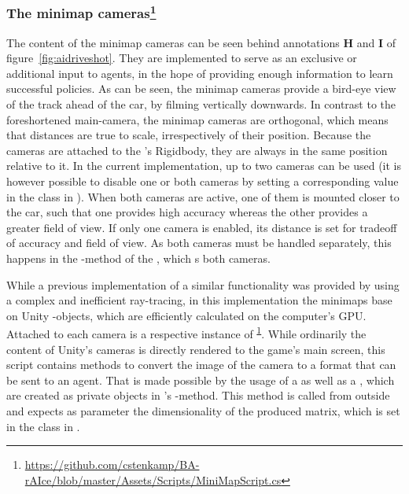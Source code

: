 \subsubsection{The minimap cameras\footnote{\label{fn:minimap}\url{https://github.com/cstenkamp/BA-rAIce/blob/master/Assets/Scripts/MiniMapScript.cs}}}
\label{ch:minimap}

The content of the minimap cameras can be seen behind annotations \textbf{H} and \textbf{I} of figure~\ref{fig:aidriveshot}. They are implemented to serve as an exclusive or additional input to agents, in the hope of providing enough information to learn successful policies. As can be seen, the minimap cameras provide a bird-eye view of the track ahead of the car, by filming vertically downwards. In contrast to the foreshortened main-camera, the minimap cameras are orthogonal, which means that distances are true to scale, irrespectively of their position. Because the cameras are attached to the 's Rigidbody, they are always in the same position relative to it. In the current implementation, up to two cameras can be used (it is however possible to disable one or both cameras by setting a corresponding value in the class  in ). When both cameras are active, one of them is mounted closer to the car, such that one provides high accuracy whereas the other provides a greater field of view. If only one camera is enabled, its distance is set for tradeoff of accuracy and field of view. As both cameras must be handled separately, this happens in the -method of the , which s both cameras.

While a previous implementation of a similar functionality was provided by \leon using a complex and inefficient ray-tracing, in this implementation the minimaps base on Unity -objects, which are efficiently calculated on the computer's GPU. Attached to each camera is a respective instance of \textsuperscript{\ref{fn:minimap}}. While ordinarily the content of Unity's cameras is directly rendered to the game's main screen, this script contains methods to convert the image of the camera to a format that can be sent to an agent. That is made possible by the usage of a  as well as a , which are created as private objects in 's -method. This method is called from outside and expects as parameter the dimensionality of the produced matrix, which is set in the class  in . 

